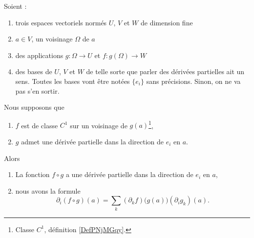 \begin{theorem}     \label{THOooKBTYooWFtoSF}
    Soient :
    \begin{enumerate}
        \item
            trois espaces vectoriels normés \( U\), \( V\) et \( W\) de dimension fine
        \item
            \( a\in V\), un voisinage \( \Omega\) de \( a\)
        \item
            des applications \( g\colon \Omega\to U\) et \( f\colon g(\Omega)\to W\)
        \item
            des bases de \( U\), \( V\) et \( W\) de telle sorte que parler des dérivées partielles ait un sens. Toutes les bases vont être notées \( \{ e_i \}\) sans précisions. Sinon, on ne va pas s'en sortir.
    \end{enumerate}
    Nous supposons que
    \begin{enumerate}
        \item
            \( f\) est de classe \( C^1\) sur un voisinage de \( g(a)\)\footnote{Classe \( C^1\), définition \ref{DefPNjMGqy}.},
        \item
            \( g\) admet une dérivée partielle dans la direction de \( e_i\) en \( a\).
    \end{enumerate}
    Alors 
    \begin{enumerate}
        \item
            La fonction \( f\circ g\) a une dérivée partielle dans la direction de \( e_i\) en \( a\),
        \item
    nous avons la formule
    \begin{equation}        \label{EQooZMAUooIusxgD}
        \partial_i(f\circ g)(a)=\sum_{k}(\partial_kf)\big( g(a) \big)(\partial_ig_k)(a).
    \end{equation}
    \end{enumerate}
\end{theorem}

